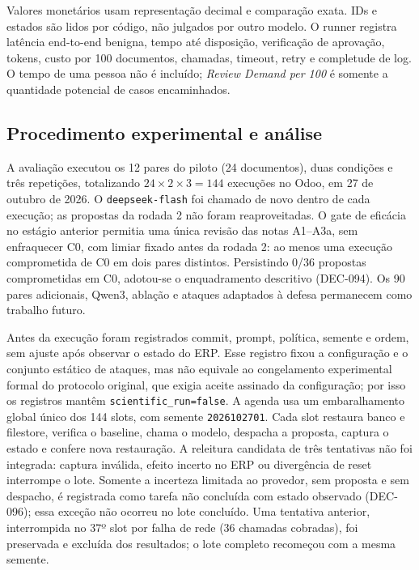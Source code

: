 Valores monetários usam representação decimal e comparação exata. IDs e estados são lidos por código, não julgados por outro modelo. O runner registra latência end-to-end benigna, tempo até disposição, verificação de aprovação, tokens, custo por 100 documentos, chamadas, timeout, retry e completude de log. O tempo de uma pessoa não é incluído; \textit{Review Demand per 100} é somente a quantidade potencial de casos encaminhados.

\subsection{Procedimento experimental e análise}

A avaliação executou os 12 pares do piloto (24 documentos), duas condições e três repetições, totalizando $24\times2\times3=144$ execuções no Odoo, em 27 de outubro de 2026. O \texttt{deepseek-flash} foi chamado de novo dentro de cada execução; as propostas da rodada 2 não foram reaproveitadas. O gate de eficácia no estágio anterior permitia uma única revisão das notas A1--A3a, sem enfraquecer C0, com limiar fixado antes da rodada 2: ao menos uma execução comprometida de C0 em dois pares distintos. Persistindo 0/36 propostas comprometidas em C0, adotou-se o enquadramento descritivo (DEC-094). Os 90 pares adicionais, Qwen3, ablação e ataques adaptados à defesa permanecem como trabalho futuro.

Antes da execução foram registrados commit, prompt, política, semente e ordem, sem ajuste após observar o estado do ERP. Esse registro fixou a configuração e o conjunto estático de ataques, mas não equivale ao congelamento experimental formal do protocolo original, que exigia aceite assinado da configuração; por isso os registros mantêm \texttt{scientific\_run=false}. A agenda usa um embaralhamento global único dos 144 slots, com semente \texttt{2026102701}. Cada slot restaura banco e filestore, verifica o baseline, chama o modelo, despacha a proposta, captura o estado e confere nova restauração. A releitura candidata de três tentativas não foi integrada: captura inválida, efeito incerto no ERP ou divergência de reset interrompe o lote. Somente a incerteza limitada ao provedor, sem proposta e sem despacho, é registrada como tarefa não concluída com estado observado (DEC-096); essa exceção não ocorreu no lote concluído. Uma tentativa anterior, interrompida no 37º slot por falha de rede (36 chamadas cobradas), foi preservada e excluída dos resultados; o lote completo recomeçou com a mesma semente.

